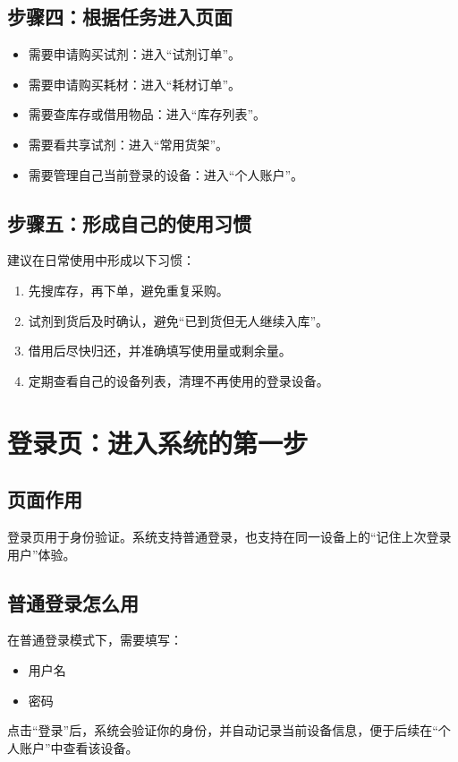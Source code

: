 \documentclass[12pt,a4paper]{ctexart}
\begin{document}
\subsection{步骤四：根据任务进入页面}
\begin{itemize}
  \item 需要申请购买试剂：进入“试剂订单”。
  \item 需要申请购买耗材：进入“耗材订单”。
  \item 需要查库存或借用物品：进入“库存列表”。
  \item 需要看共享试剂：进入“常用货架”。
  \item 需要管理自己当前登录的设备：进入“个人账户”。
\end{itemize}

\subsection{步骤五：形成自己的使用习惯}
建议在日常使用中形成以下习惯：
\begin{enumerate}
  \item 先搜库存，再下单，避免重复采购。
  \item 试剂到货后及时确认，避免“已到货但无人继续入库”。
  \item 借用后尽快归还，并准确填写使用量或剩余量。
  \item 定期查看自己的设备列表，清理不再使用的登录设备。
\end{enumerate}

\newpage
\section{登录页：进入系统的第一步}

\subsection{页面作用}
登录页用于身份验证。系统支持普通登录，也支持在同一设备上的“记住上次登录用户”体验。

\subsection{普通登录怎么用}
在普通登录模式下，需要填写：
\begin{itemize}
  \item 用户名
  \item 密码
\end{itemize}
点击“登录”后，系统会验证你的身份，并自动记录当前设备信息，便于后续在“个人账户”中查看该设备。
\end{document}
